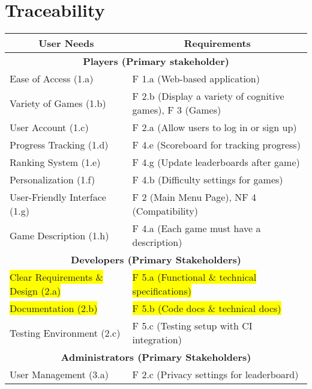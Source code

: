 \documentclass[11pt,a4paper]{article}
\begin{document}
\section{Traceability}
\begin{table}[H]
\begin{tabular}{|l|l|}
\hline
\multicolumn{1}{|c|}{\textbf{User Needs}}    & \multicolumn{1}{|c|}{\textbf{Requirements}}                   \\ \hline
\multicolumn{2}{|c|}{\textbf{Players (Primary stakeholder)}}                                           \\ \hline
Ease of Access (1.a)                         & F 1.a (Web-based application)                \\
Variety of Games (1.b)                       & F 2.b (Display a variety of cognitive games), F 3 (Games) \\
User Account (1.c)                           & F 2.a (Allow users to log in or sign up)     \\
Progress Tracking (1.d)                      & F 4.e (Scoreboard for tracking progress)     \\
Ranking System (1.e)                         & F 4.g (Update leaderboards after game)       \\
Personalization (1.f)                        & F 4.b (Difficulty settings for games)        \\
User-Friendly Interface (1.g)                & F 2 (Main Menu Page), NF 4 (Compatibility)   \\
Game Description (1.h)                       & F 4.a (Each game must have a description)    \\
\hline
\multicolumn{2}{|c|}{\textbf{Developers (Primary Stakeholders)}}                                       \\
\hline
\colorbox{yellow}{Clear Requirements \& Design (2.a)}           & \colorbox{yellow}{F 5.a (Functional \& technical specifications)} \\
\colorbox{yellow}{Documentation (2.b)   }                       & \colorbox{yellow}{F 5.b (Code docs \& technical docs)  }        \\
Testing Environment (2.c)                   & 
F 5.c (Testing setup with CI integration)    \\
\hline
\multicolumn{2}{|c|}{\textbf{Administrators (Primary Stakeholders)}}                                   \\
\hline
User Management (3.a)                 &  F 2.c (Privacy settings for leaderboard)    \\

\end{tabular}
\end{table}
\end{document}
